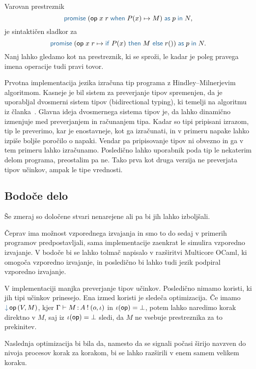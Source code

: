
Varovan prestreznik $$\tmwithrecgu{op}{x}{r}{P(x)}{M}{p}{N},$$ je sintaktičen sladkor za $$\tmwithrec{op}{x}{r}{\tmif{P(x)}{M}{r()}}{p}{N}.$$
Nanj lahko gledamo kot na prestreznik, ki se sproži, le kadar je poleg pravega imena operacije tudi pravi tovor.

Prvotna implementacija jezika \aeff{} izračuna tip programa z Hindley–Milnerjevim algoritmom. 
Kasneje je bil sistem za preverjanje tipov spremenjen, da je uporabljal dvosmerni sistem tipov (bidirectional typing), ki temelji na algoritmu iz članka~\cite{bidirectional}.
Glavna ideja dvosmernega sistema tipov je, da lahko dinamično izmenjuje med preverjanjem in računanjem tipa.
Kadar so tipi pripisani izrazom, tip le preverimo, kar je enostavneje, kot ga izračunati, in v primeru napake lahko izpiše boljše poročilo o napaki.
Vendar pa pripisovanje tipov ni obvezno in ga v tem primeru lahko izračunamo.
Posledično lahko uporabnik poda tip le nekaterim delom programa, preostalim pa ne.
Tako prva kot druga verzija ne preverjata tipov učinkov, ampak le tipe vrednosti.

\subsection{Bodoče delo}

Še zmeraj so določene stvari nenarejene ali pa bi jih lahko izboljšali.

Čeprav ima \aeff{} možnost vzporednega izvajanja in smo to do sedaj v primerih programov predpostavljali, sama implementacije zaenkrat le simulira vzporedno izvajanje.
V bodoče bi se lahko tolmač napisalo v razširitvi Multicore OCaml, ki omogoča vzporedno izvajanje, in posledično bi lahko tudi jezik \aeff{} podpiral vzporedno izvajanje. 

V implementaciji manjka preverjanje tipov učinkov. Posledično nimamo koristi, ki jih tipi učinkov prinesejo.
Ena izmed koristi je sledeča optimizacija.
Če imamo $\tmopin{op}{V}{M}$, kjer $\Gamma \vdash M \mathinner{:} A \mathbin{!} (o, \iota)$ in $\iota(\mathsf{op}) = \bot$, potem lahko naredimo korak direktno v $M$, saj iz $\iota(\mathsf{op}) = \bot$ sledi, da $M$ ne vsebuje prestreznika za to prekinitev. 

Naslednja optimizacija bi bila da, namesto da se signali počasi širijo navzven do nivoja procesov korak za korakom, bi se lahko razširili v enem samem velikem koraku.

